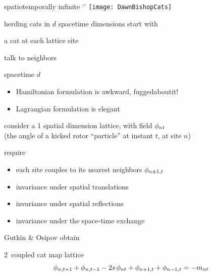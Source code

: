 \begin{frame}{spatiotemporally infinite `\catlatt'}
\hfill\texttt{[image: DawnBishopCats]}
\end{frame} %


\begin{frame}{herding cats in $d$ spacetime dimensions}
start with
\begin{block}{a cat at each lattice site}
\bigskip

talk to neighbors
\medskip

spacetime $d$\dmn\
~~~~~~~ {\color{blue}\Large \catlatt}
\end{block}

\vfill

\begin{itemize}
  \item {\scriptsize Hamiltonian formulation is awkward, fuggedaboutit!}
  \item Lagrangian formulation is elegant
\end{itemize}
\end{frame} %

\begin{frame}{\catlatt}
consider
a 1 {\color{blue}spatial} dimension lattice, with field
$\phi_{nt}$ \\
(the angle of a kicked
rotor ``particle'' at instant $t$, at site $n$)
\begin{block}{require}
\begin{itemize}
\item  each site couples to
its nearest neighbors $\phi_{n\pm1,t}$
\item  invariance under
spatial translations
\item  invariance under spatial reflections
\item  invariance under the space-time exchange
\end{itemize}
\end{block}

\bigskip

Gutkin \& Osipov obtain
\begin{block}{2\dmn\ coupled cat map lattice}
\[
\phi_{n,t+1} + \phi_{n,t-1} - 2s \, \phi_{n t} + \phi_{n+1,t} + \phi_{n-1, t}
     =-{m_{n t}}
\] %
\end{block}
\end{frame} %

